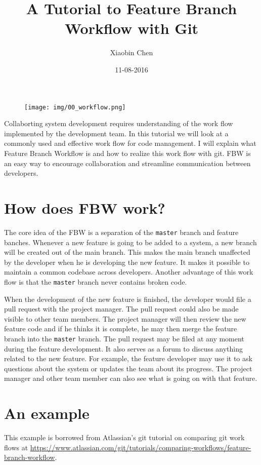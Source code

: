 \documentclass{article}
\title{A Tutorial to Feature Branch Workflow with Git}
\author{Xiaobin Chen}
\date{11-08-2016}
\begin{document}
\maketitle

\begin{figure}[h!]
	\texttt{[image: img/00\_workflow.png]}
\end{figure}


Collaborting system development requires understanding of the work flow
implemented by the development team. In this tutorial we will look at a
commonly used and effective work flow for code management. I will explain what
Feature Branch Workflow is and how to realize this work flow with git. FBW is
an easy way to encourage collaboration and streamline communication between
developers.

\section{How does FBW work?}

The core idea of the FBW is a separation of the \texttt{master} branch and feature
banches. Whenever a new feature is going to be added to a system, a new branch
will be created out of the main branch. This makes the main branch unaffected
by the developer when he is developing the new feature. It makes it possible to
maintain a common codebase across developers. Another advantage of this work
flow is that the \texttt{master} branch never contains broken code. 

When the development of the new feature is finished, the developer would file a
pull request with the project manager. The pull request could also be made
visible to other team members. The project manager will then review the new
feature code and if he thinks it is complete, he may then merge the feature
branch into the \texttt{master} branch. The pull request may be filed at any moment
during the feature development. It also serves as a forum to discuss anything
related to the new feature. For example, the feature developer may use it to
ask questions about the system or updates the team about its progress. The
project manager and other team member can also see what is going on with that
feature. 

\section{An example} 

This example is borrowed from Atlassian's git tutorial on
comparing git work flows at
\url{https://www.atlassian.com/git/tutorials/comparing-workflows/feature-branch-workflow}.
\end{document}
